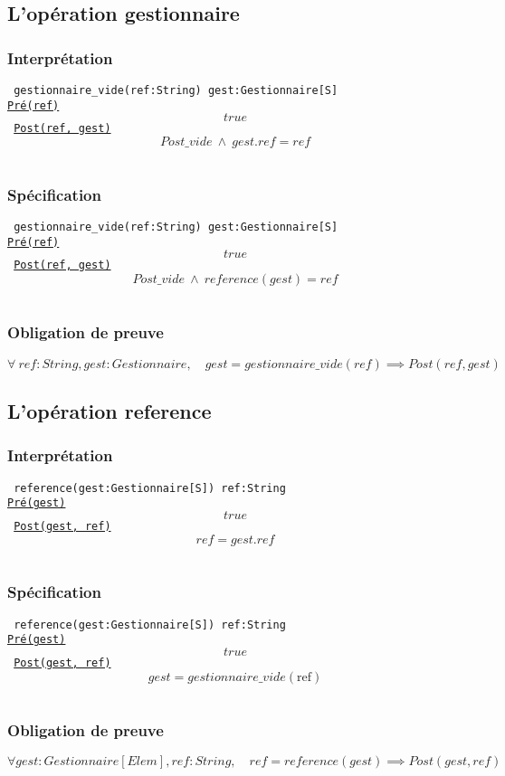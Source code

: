 \documentclass{article}
\begin{document}
\subsection{L'opération gestionnaire}
\subsubsection{Interprétation}
{\tt
gestionnaire\_vide(ref:String) gest:Gestionnaire[S]\\
\underline{Pré(ref)}
$$ true $$
\underline{Post(ref, gest)}
$$ Post\_vide\ \wedge\ gest.ref = ref$$
}

\subsubsection{Spécification}
{\tt
gestionnaire\_vide(ref:String) gest:Gestionnaire[S]\\
\underline{Pré(ref)}
$$ true $$
\underline{Post(ref, gest)}
$$ Post\_vide\ \wedge\ reference(gest) = ref$$
}

\subsubsection{Obligation de preuve}
$$ \forall\ ref:String, gest:Gestionnaire,\quad gest = gestionnaire\_vide(ref) \implies Post(ref, gest)$$

\subsection{L'opération reference}
\subsubsection{Interprétation}
{\tt
reference(gest:Gestionnaire[S]) ref:String\\
\underline{Pré(gest)}
$$ true $$
\underline{Post(gest, ref)}
$$ ref = gest.ref $$
}

\subsubsection{Spécification}
{\tt
reference(gest:Gestionnaire[S]) ref:String\\
\underline{Pré(gest)}
$$ true $$
\underline{Post(gest, ref)}
$$ gest = gestionnaire\_vide(\text{ref}) $$
}

\subsubsection{Obligation de preuve}
$$ \forall gest:Gestionnaire[Elem], ref:String, \quad ref = reference(gest) \implies Post(gest, ref) $$
\end{document}
